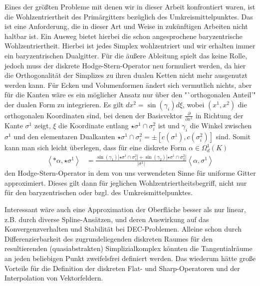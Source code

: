 Eines der größten Probleme mit denen wir in dieser Arbeit konfrontiert waren, ist die Wohlzentriertheit des Primärgitters bezüglich des
Umkreismittelpunktes. 
Das ist eine Anforderung, die in dieser Art und Weise in zukünftigen Arbeiten nicht haltbar ist.
Ein Ausweg bietet hierbei die schon angesprochene baryzentrische Wohlzentriertheit.
Hierbei ist jedes Simplex wohlzentriert und wir erhalten immer ein baryzentrischen Dualgitter.
Für die äußere Ableitung spielt das keine Rolle, jedoch muss der diskrete Hodge-Stern-Operator neu formuliert werden, da hier die
Orthogonalität der Simplizes zu ihren dualen Ketten nicht mehr ausgenutzt werden kann. 
Für Ecken und Volumenformen ändert sich vermutlich nichts, aber für die Kanten wäre es ein möglicher Ansatz nur über den "`orthogonalen Anteil'" der dualen
Form zu integrieren.
Es gilt \( dx^{2}= \sin\left( \gamma_{i} \right) d\xi \), 
wobei \( \left( x^{1},x^{2} \right) \) die orthogonalen Koordinaten sind,
bei denen der Basisvektor \( \frac{\partial}{\partial x^{1}} \) in Richtung der Kante \( \sigma^{1} \) zeigt,
\( \xi \) die Koordinate entlang \( \star\sigma^{1}\cap\sigma^{2}_{i} \) ist
und \( \gamma_{i} \) die Winkel zwischen \( \sigma^{1} \) und den elementaren Dualkanten
\( \star\sigma^{1}\cap\sigma^{2}_{i} = \pm \left[ c(\sigma^{1}),c(\sigma^{2}_{i})  \right] \) sind.
Somit kann man sich leicht überlegen, dass für eine diskrete Form \( \alpha\in\Omega^{1}_{d}(K) \)
\begin{align}
  \left\langle *\alpha, \star\sigma^{1} \right\rangle
      &= \frac{\sin\left( \gamma_{1} \right)\left| \star\sigma^{1}\cap\sigma^{2}_{1} \right|
              +\sin\left( \gamma_{2} \right)\left| \star\sigma^{1}\cap\sigma^{2}_{2} \right| }
              {\left| \sigma^{1} \right|}
           \left\langle \alpha,\sigma^{1} \right\rangle
\end{align}
den Hodge-Stern-Operator in dem von uns verwendeten Sinne für uniforme Gitter approximiert.
Dieses gilt dann für jeglichen Wohlzentriertheitsbegriff, nicht nur für den baryzentrischen oder bzgl. des Umkreismittelpunktes.

Interessant wäre auch eine Approximation der Oberfläche besser als nur linear, z.B. durch diverse Spline-Ansätzen, und deren Auswirkung auf das Konvergenzverhalten und
Stabilität bei DEC-Problemen. 
Alleine schon durch Differenzierbarkeit des zugrundeliegenden diskreten Raumes für den resultierenden (quasiabstrakten) Simplizialkomplex
könnten die Tangentialräume an jeden beliebigen Punkt zweifelsfrei definiert werden.
Das wiederum hätte große Vorteile für die Definition der diskreten Flat- und Sharp-Operatoren und der Interpolation von Vektorfeldern.

